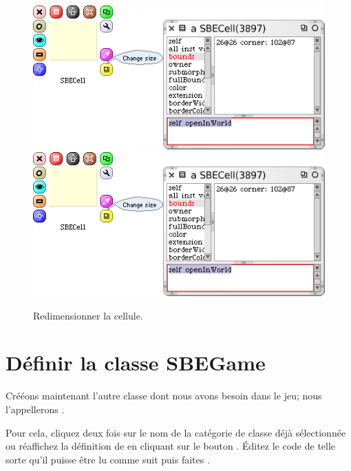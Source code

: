 \documentclass[a4paper,10pt,twoside]{book}
\begin{document}
\begin{figure}[htbp]
\centering
\ifluluelse
	{\includegraphics[width=\textwidth]{SBECellResize} }
	{\includegraphics[scale=0.7]{SBECellResize} }
\caption{Redimensionner la cellule.\label{fig:cellresize}}
\end{figure}


\section{Définir la classe SBEGame}

Crééons maintenant l'autre classe dont nous avons besoin dans le jeu; nous l'appellerons .

Pour cela, cliquez deux fois sur le nom de la cat\'egorie de classe
d\'ej\`a s\'electionn\'ee ou r\'eaffichez la définition de  en cliquant sur le bouton .
Éditez le code de telle sorte qu'il puisse être lu comme suit puis faites .
\end{document}
